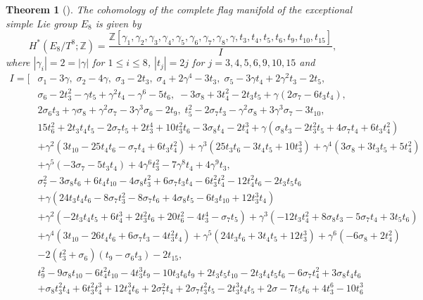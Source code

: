 \documentclass{article}
\theoremstyle{plain}
\newtheorem{thm}{Theorem}[section]
\theoremstyle{definition}
\numberwithin{thm}{section}
\begin{document}
		\begin{thm}[\cite{nakagawaE8}]\label{thm:H*E8/T}
			The cohomology of the complete flag manifold of the exceptional simple Lie group $E_8$ is given by
			\begin{equation*}
				H^*(E_8/T^8;\mathbb{Z})=\frac{\mathbb{Z}[\gamma_1,\gamma_2,\gamma_3,\gamma_4,\gamma_5,\gamma_6,\gamma_7,\gamma_8,\gamma,t_3,t_4,t_5,t_6,t_9,t_{10},t_{15}]}{I},
			\end{equation*}
			where $|\gamma_i|=2=|\gamma|$ for $1\leq i \leq 8$, $|t_j|=2j$ for $j=3,4,5,6,9,10,15$ and
			\begin{align*}
				I=[
				&\sigma_1-3\gamma, \;
				\sigma_2-4\gamma, \;
				\sigma_3-2t_3, \;
				\sigma_4+2\gamma^4-3t_3, \;
				\sigma_5-3\gamma t_4+2\gamma^2t_3-2t_5, \\
				&\sigma_6-2t_3^2-\gamma t_5+\gamma^2t_4-\gamma^6-5t_6, \; 
				-3\sigma_8+3t_4^2-2t_3t_5+\gamma(2\sigma_7-6t_3t_4), \\
				&2\sigma_6t_3+\gamma\sigma_8+\gamma^2\sigma_7-3\gamma^3\sigma_6-2t_9, \;
				t_5^2-2\sigma_7t_3-\gamma^2\sigma_8+3\gamma^3\sigma_7-3t_{10}, \\
				&15t_6^2+2t_3t_4t_5-2\sigma_7t_5+2t_3^4+10t_3^2t_6-3\sigma_8t_4-2t_4^3
					+\gamma(\sigma_8t_3-2t_3^2t_5+4\sigma_7t_4+6t_3t_4^2) \\
					&+\gamma^2(3t_10-25t_4t_6-\sigma_7t_4+6t_3t_4^2) 
					+\gamma^3(25t_3t_6-3t_4t_5+10t_3^3)
					+\gamma^4(3\sigma_8+3t_3t_5+5t_4^2) \\
					&+\gamma^5(-3\sigma_7-5t_3t_4)+4\gamma^6t_3^2-7\gamma^8t_4+4\gamma^9t_3, \\
				&\sigma_7^2-3\sigma_8t_6+6t_4t_{10}-4\sigma_8t_3^2+6\sigma_7t_3t_4-6t_3^2t_4^2-12t_4^2t_6-2t_3t_5t_6 \\
					&+\gamma(24t_3t_4t_6-8\sigma_7t_3^2-8\sigma_7t_6+4\sigma_8t_5-6t_3t_{10}+12t_3^3t_4) \\
					&+\gamma^2(-2t_3t_4t_5+6t_4^3+2t_3^2t_6+20t_6^2-4t_3^4-\sigma_7t_5)
					+\gamma^3(-12t_3t_4^2+8\sigma_8t_3-5\sigma_7t_4+3t_5t_6) \\
					&+\gamma^4(3t_{10}-26t_4t_6+6\sigma_7t_3-4t_3^2t_4)
					+\gamma^5(24t_3t_6+3t_4t_5+12t_3^3)
					+\gamma^6(-6\sigma_8+2t_4^2)\\
					&-2(t_3^2+\sigma_6)(t_9-\sigma_6t_3)-2t_{15}, \\
				&t_9^2-9\sigma_8t_{10}-6t_4^2t_{10}-4t_3^3t_9-10t_3t_6t_9+2t_3t_5t_{10}-2t_3t_4t_5t_6-6\sigma_7t_4^2+3\sigma_8t_4t_6 \\
					&+\sigma_8t_3^2t_4+6t_3^2t_4^3+12t_4^3t_6+2\sigma_7^2t_4+2\sigma_7t_3^2t_5-2t_3^3t_4t_5+2\sigma-7t_5t_6+4t_3^6-10t_6^3 \\

\end{align*}
\end{thm}
\end{document}
